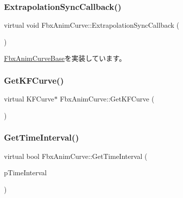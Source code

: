 \subsubsection{\texorpdfstring{Extrapolation\+Sync\+Callback()}{ExtrapolationSyncCallback()}}
{\footnotesize\ttfamily virtual void Fbx\+Anim\+Curve\+::\+Extrapolation\+Sync\+Callback (\begin{DoxyParamCaption}{ }\end{DoxyParamCaption})\hspace{0.3cm}{\ttfamily [pure virtual]}}



\hyperlink{class_fbx_anim_curve_base_aab573e42ece898c2c1e61a295adbb610}{Fbx\+Anim\+Curve\+Base}を実装しています。

\mbox{\label{class_fbx_anim_curve_a7c7cbe48da39fa57af9f32acc68a0ba5}} 
\subsubsection{\texorpdfstring{Get\+K\+F\+Curve()}{GetKFCurve()}}
{\footnotesize\ttfamily virtual K\+F\+Curve$\ast$ Fbx\+Anim\+Curve\+::\+Get\+K\+F\+Curve (\begin{DoxyParamCaption}{ }\end{DoxyParamCaption})\hspace{0.3cm}{\ttfamily [pure virtual]}}

\mbox{\label{class_fbx_anim_curve_aa547431c44acd9eb28aebdec1a142501}} 
\subsubsection{\texorpdfstring{Get\+Time\+Interval()}{GetTimeInterval()}}
{\footnotesize\ttfamily virtual bool Fbx\+Anim\+Curve\+::\+Get\+Time\+Interval (\begin{DoxyParamCaption}\item[{\hyperlink{class_fbx_time_span}{Fbx\+Time\+Span} \&}]{p\+Time\+Interval }\end{DoxyParamCaption})\hspace{0.3cm}{\ttfamily [pure virtual]}}

